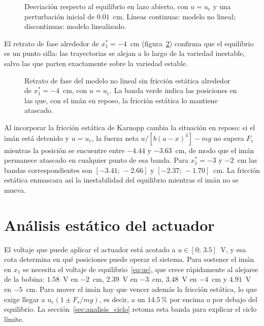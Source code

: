 \begin{figure}[ht]
    \centering
    
    \caption[Lazo abierto en los puntos de equilibrio]{Desviación respecto al equilibrio en lazo abierto, con $u=u_e$ y una perturbación inicial de $0.01$~cm. Líneas continuas: modelo no lineal; discontinuas: modelo linealizado.}
    \label{fig:p8_lazo_abierto}
\end{figure}

El retrato de fase alrededor de $x_1^*=-4$~cm (figura~\ref{fig:p8_retrato}) confirma que el equilibrio es un punto silla: las trayectorias se alejan a lo largo de la variedad inestable, salvo las que parten exactamente sobre la variedad estable.


\begin{figure}[ht]
    \centering
    
    \caption[Retrato de fase en lazo abierto]{Retrato de fase del modelo no lineal sin fricción estática alrededor de $x_1^*=-4$~cm, con $u=u_e$. La banda verde indica las posiciones en las que, con el imán en reposo, la fricción estática lo mantiene atascado.}
    \label{fig:p8_retrato}
\end{figure}

Al incorporar la fricción estática de Karnopp cambia la situación en reposo: si el imán está detenido y $u=u_e$, la fuerza neta $u/[b(a-x)^4]-mg$ no supera $F_s$ mientras la posición se encuentre entre $-4.44$ y $-3.63$~cm, de modo que el imán permanece atascado en cualquier punto de esa banda. Para $x_1^*=-3$ y $-2$~cm las bandas correspondientes son $[-3.41;\,-2.66]$ y $[-2.37;\,-1.70]$~cm. La fricción estática enmascara así la inestabilidad del equilibrio mientras el imán no se mueva.

\FloatBarrier

\section{Análisis estático del actuador}\label{sec:actuador_estatico}

El voltaje que puede aplicar el actuador está acotado a $u\in[0;\,3.5]$~V, y esa cota determina en qué posiciones puede operar el sistema. Para sostener el imán en $x_1$ se necesita el voltaje de equilibrio~\eqref{eq:ue}, que crece rápidamente al alejarse de la bobina: $1.58$~V en $-2$~cm, $2.39$~V en $-3$~cm, $3.48$~V en $-4$~cm y $4.91$~V en $-5$~cm. Para mover el imán hay que vencer además la fricción estática, lo que exige llegar a $u_e(1\pm F_s/mg)$, es decir, a un $14.5$\,\% por encima o por debajo del equilibrio. La sección~\ref{sec:analisis_ciclo} retoma esta banda para explicar el ciclo límite.

